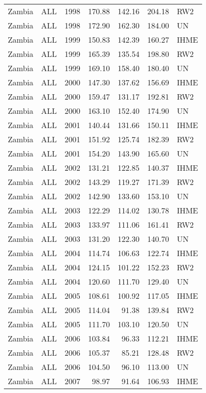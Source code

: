 \begin{longtable}{lllrrrl}
  Zambia & ALL & 1998 & 170.88 & 142.16 & 204.18 & RW2 \\ 
  Zambia & ALL & 1998 & 172.90 & 162.30 & 184.00 & UN \\ 
  Zambia & ALL & 1999 & 150.83 & 142.39 & 160.27 & IHME \\ 
  Zambia & ALL & 1999 & 165.39 & 135.54 & 198.80 & RW2 \\ 
  Zambia & ALL & 1999 & 169.10 & 158.40 & 180.40 & UN \\ 
  Zambia & ALL & 2000 & 147.30 & 137.62 & 156.69 & IHME \\ 
  Zambia & ALL & 2000 & 159.47 & 131.17 & 192.81 & RW2 \\ 
  Zambia & ALL & 2000 & 163.10 & 152.40 & 174.90 & UN \\ 
  Zambia & ALL & 2001 & 140.44 & 131.66 & 150.11 & IHME \\ 
  Zambia & ALL & 2001 & 151.92 & 125.74 & 182.39 & RW2 \\ 
  Zambia & ALL & 2001 & 154.20 & 143.90 & 165.60 & UN \\ 
  Zambia & ALL & 2002 & 131.21 & 122.85 & 140.37 & IHME \\ 
  Zambia & ALL & 2002 & 143.29 & 119.27 & 171.39 & RW2 \\ 
  Zambia & ALL & 2002 & 142.90 & 133.60 & 153.10 & UN \\ 
  Zambia & ALL & 2003 & 122.29 & 114.02 & 130.78 & IHME \\ 
  Zambia & ALL & 2003 & 133.97 & 111.06 & 161.41 & RW2 \\ 
  Zambia & ALL & 2003 & 131.20 & 122.30 & 140.70 & UN \\ 
  Zambia & ALL & 2004 & 114.74 & 106.63 & 122.74 & IHME \\ 
  Zambia & ALL & 2004 & 124.15 & 101.22 & 152.23 & RW2 \\ 
  Zambia & ALL & 2004 & 120.60 & 111.70 & 129.40 & UN \\ 
  Zambia & ALL & 2005 & 108.61 & 100.92 & 117.05 & IHME \\ 
  Zambia & ALL & 2005 & 114.04 & 91.38 & 139.84 & RW2 \\ 
  Zambia & ALL & 2005 & 111.70 & 103.10 & 120.50 & UN \\ 
  Zambia & ALL & 2006 & 103.84 & 96.33 & 112.21 & IHME \\ 
  Zambia & ALL & 2006 & 105.37 & 85.21 & 128.48 & RW2 \\ 
  Zambia & ALL & 2006 & 104.50 & 96.10 & 113.00 & UN \\ 
  Zambia & ALL & 2007 & 98.97 & 91.64 & 106.93 & IHME \\ 

\end{longtable}
